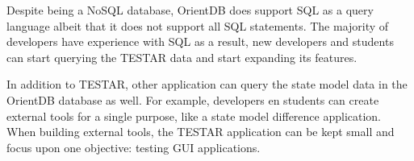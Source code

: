 Despite being a NoSQL database, OrientDB does support SQL as a query language \cite{sql-lang} albeit that it does not support all SQL statements. The majority of developers have experience with SQL \cite{sql-stats} as a result, new developers and students can start querying the TESTAR data and start expanding its features.\par

In addition to TESTAR, other application can query the state model data in the OrientDB database as well. For example, developers en students can create external tools for a single purpose, like a state model difference application. When building external tools, the TESTAR application can be kept small and focus upon one objective: testing GUI applications. 